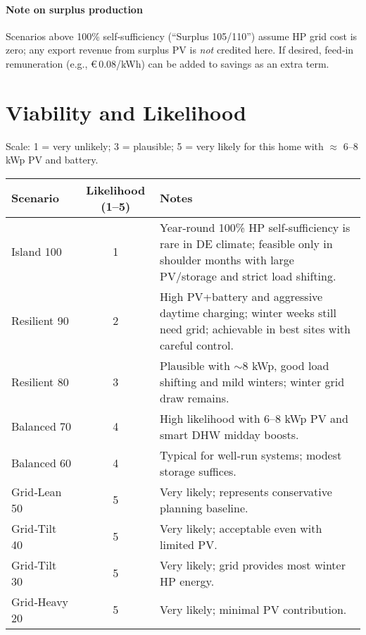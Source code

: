 \documentclass[11pt,oneside]{report}
\begin{document}
\paragraph{Note on surplus production} Scenarios above 100\% self‑sufficiency (``Surplus 105/110'') assume HP grid cost is zero; any export revenue from surplus PV is \emph{not} credited here. If desired, feed‑in remuneration (e.g., \euro\,\num{0.08}/kWh) can be added to savings as an extra term.

\section{Viability and Likelihood}
Scale: 1 = very unlikely; 3 = plausible; 5 = very likely for this home with \(\approx\) 6–8 kWp PV and battery.

\begin{longtable}{@{}lcl@{}}
\toprule
Scenario & Likelihood (1–5) & Notes \\
\midrule
Island 100 & 1 & Year‑round 100\% HP self‑sufficiency is rare in DE climate; feasible only in shoulder months with large PV/storage and strict load shifting.
\\
Resilient 90 & 2 & High PV+battery and aggressive daytime charging; winter weeks still need grid; achievable in best sites with careful control.
\\
Resilient 80 & 3 & Plausible with \(\sim\)8 kWp, good load shifting and mild winters; winter grid draw remains.
\\
Balanced 70 & 4 & High likelihood with 6–8 kWp PV and smart DHW midday boosts.
\\
Balanced 60 & 4 & Typical for well‑run systems; modest storage suffices.
\\
Grid‑Lean 50 & 5 & Very likely; represents conservative planning baseline.
\\
Grid‑Tilt 40 & 5 & Very likely; acceptable even with limited PV.
\\
Grid‑Tilt 30 & 5 & Very likely; grid provides most winter HP energy.
\\
Grid‑Heavy 20 & 5 & Very likely; minimal PV contribution.
\\
\bottomrule
\end{longtable}
\end{document}
